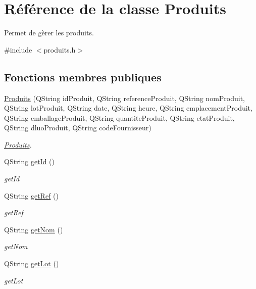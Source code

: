 \hypertarget{class_produits}{}\section{Référence de la classe Produits}
\label{class_produits}


Permet de gèrer les produits.  




{\ttfamily \#include $<$produits.\+h$>$}

\subsection*{Fonctions membres publiques}
\begin{DoxyCompactItemize}
\item 
\mbox{\hyperlink{class_produits_a15c147533085976d625665764f79fd7b}{Produits}} (Q\+String id\+Produit, Q\+String reference\+Produit, Q\+String nom\+Produit, Q\+String lot\+Produit, Q\+String date, Q\+String heure, Q\+String emplacement\+Produit, Q\+String emballage\+Produit, Q\+String quantite\+Produit, Q\+String etat\+Produit, Q\+String dluo\+Produit, Q\+String code\+Fournisseur)
\begin{DoxyCompactList}\small\item\em \mbox{\hyperlink{class_produits}{Produits}}. \end{DoxyCompactList}\item 
Q\+String \mbox{\hyperlink{class_produits_a3aee7de9dc5c38b50decec407bbd0754}{get\+Id}} ()
\begin{DoxyCompactList}\small\item\em get\+Id \end{DoxyCompactList}\item 
Q\+String \mbox{\hyperlink{class_produits_a0fef797c8b1c1ae2aa5687e53aadb48b}{get\+Ref}} ()
\begin{DoxyCompactList}\small\item\em get\+Ref \end{DoxyCompactList}\item 
Q\+String \mbox{\hyperlink{class_produits_a5708325c18db12146f0465448398be84}{get\+Nom}} ()
\begin{DoxyCompactList}\small\item\em get\+Nom \end{DoxyCompactList}\item 
Q\+String \mbox{\hyperlink{class_produits_a61d14c4abe4fa116b6a2993feb27bf7f}{get\+Lot}} ()
\begin{DoxyCompactList}\small\item\em get\+Lot \end{DoxyCompactList}\item 

\end{DoxyCompactItemize}
